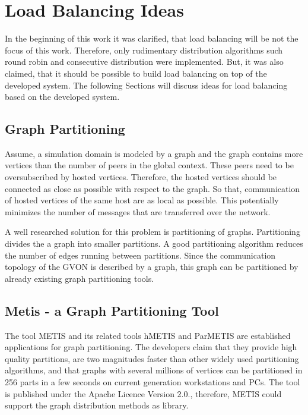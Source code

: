 \section*{Load Balancing Ideas}

In the beginning of this work it was clarified, that load balancing
will be not the focus of this work. Therefore, only rudimentary
distribution algorithms such round robin and consecutive distribution
were implemented. But, it was also claimed, that it should be possible
to build load balancing on top of the developed system.  The following
Sections will discuss ideas for load balancing based on the developed
system.

\subsection*{Graph Partitioning}

Assume, a simulation domain is modeled by a graph and the graph
contains more vertices than the number of peers in the global
context. These peers need to be oversubscribed by hosted vertices.
Therefore, the hosted vertices should be connected as close as
possible with respect to the graph. So that, communication of hosted
vertices of the same host are as local as possible.  This potentially
minimizes the number of messages that are transferred over the
network.

A well researched solution for this problem is partitioning of
graphs. Partitioning divides the a graph into smaller partitions.  A
good partitioning algorithm reduces the number of edges running
between partitions.  Since the communication topology of the GVON is
described by a graph, this graph can be partitioned by already
existing graph partitioning tools.

\subsection*{Metis - a Graph Partitioning Tool}
The tool METIS and its related tools hMETIS and ParMETIS are
established applications for graph partitioning. The developers claim
that they provide high quality partitions, are two magnitudes faster
than other widely used partitioning algorithms, and that graphs with
several millions of vertices can be partitioned in 256 parts in a few
seconds on current generation workstations and PCs.  The tool is
published under the Apache Licence Version 2.0., therefore, METIS
could support the graph distribution methods as library.
  
